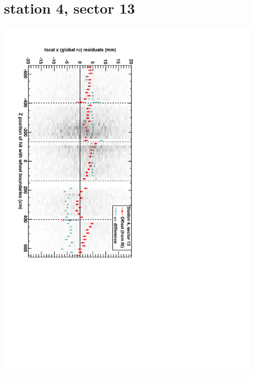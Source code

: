 \documentclass[compress]{beamer}
\begin{document}
\section*{station 4, sector 13}
\begin{frame} \vfill \mbox{\hspace{-1 cm}\includegraphics[height=1.2\linewidth, angle=90]{DTrphiVsZ_st4_sr13.pdf}} \end{frame}
\end{document}
